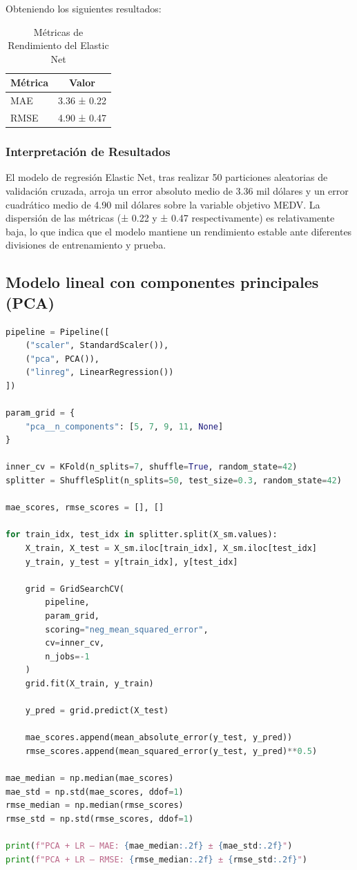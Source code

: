 \documentclass[12pt,a4paper]{article}
\begin{document}
Obteniendo los siguientes resultados:

\begin{table}[H]
\centering
\caption{Métricas de Rendimiento del Elastic Net}\label{tab:elastic_net_resultados}
\begin{tabular}{lc}
\toprule
\textbf{Métrica} & \textbf{Valor} \\
\midrule
MAE & 3.36 ± 0.22 \\
RMSE & 4.90 ± 0.47 \\
\bottomrule
\end{tabular}
\end{table}

\subsubsection{Interpretación de Resultados}
El modelo de regresión Elastic Net, tras realizar 50 particiones aleatorias de validación cruzada, arroja un error absoluto medio de 3.36 mil dólares y un error cuadrático medio de 4.90 mil dólares sobre la variable objetivo MEDV.
La dispersión de las métricas (± 0.22 y ± 0.47 respectivamente) es relativamente baja, lo que indica que el modelo mantiene un rendimiento estable ante diferentes divisiones de entrenamiento y prueba.
\vspace{1cm}

\subsection{Modelo lineal con componentes principales (PCA)}

\begin{lstlisting}[language=Python, frame=single, basicstyle=\ttfamily\small, breaklines=true]
pipeline = Pipeline([
    ("scaler", StandardScaler()),
    ("pca", PCA()),
    ("linreg", LinearRegression())
])

param_grid = {
    "pca__n_components": [5, 7, 9, 11, None]
}

inner_cv = KFold(n_splits=7, shuffle=True, random_state=42)
splitter = ShuffleSplit(n_splits=50, test_size=0.3, random_state=42)

mae_scores, rmse_scores = [], []

for train_idx, test_idx in splitter.split(X_sm.values):
    X_train, X_test = X_sm.iloc[train_idx], X_sm.iloc[test_idx]
    y_train, y_test = y[train_idx], y[test_idx]

    grid = GridSearchCV(
        pipeline,
        param_grid,
        scoring="neg_mean_squared_error",
        cv=inner_cv,
        n_jobs=-1
    )
    grid.fit(X_train, y_train)

    y_pred = grid.predict(X_test)

    mae_scores.append(mean_absolute_error(y_test, y_pred))
    rmse_scores.append(mean_squared_error(y_test, y_pred)**0.5)

mae_median = np.median(mae_scores)
mae_std = np.std(mae_scores, ddof=1)
rmse_median = np.median(rmse_scores)
rmse_std = np.std(rmse_scores, ddof=1)

print(f"PCA + LR – MAE: {mae_median:.2f} ± {mae_std:.2f}")
print(f"PCA + LR – RMSE: {rmse_median:.2f} ± {rmse_std:.2f}")
\end{lstlisting}
\end{document}
